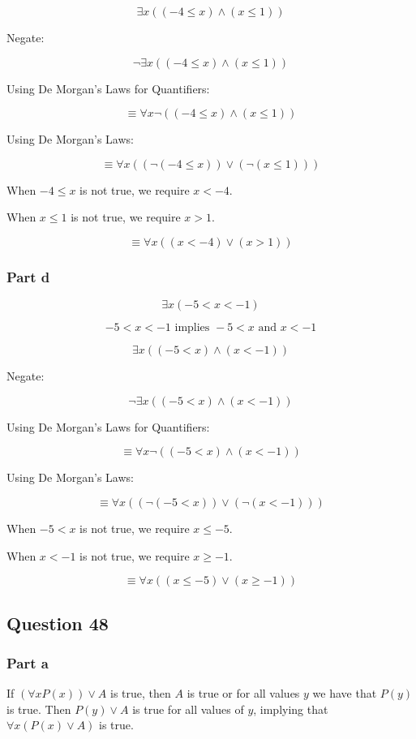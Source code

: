 \documentclass[12pt]{article}
\begin{document}
\[
\exists x ((-4 \leq x) \land (x \leq 1))
\]

Negate:

\[
\neg \exists x ((-4 \leq x) \land (x \leq 1))
\]

Using De Morgan's Laws for Quantifiers:

\[
\equiv \forall x \neg ((-4 \leq x) \land (x \leq 1))
\]

Using De Morgan's Laws:

\[
\equiv \forall x ((\neg (-4 \leq x)) \lor (\neg (x \leq 1)))
\]

When \( -4 \leq x \) is not true, we require \( x < -4 \).

When \( x \leq 1 \) is not true, we require \( x > 1 \).

\[
\equiv \forall x ((x < -4) \lor (x > 1))
\]

\subsubsection*{Part d}

\[
\exists x (-5 < x < -1)
\]

\[
-5 < x < -1 \text{ implies } -5 < x \text{ and } x < -1
\]

\[
\exists x ((-5 < x) \land (x < -1))
\]

Negate:

\[
\neg \exists x ((-5 < x) \land (x < -1))
\]

Using De Morgan's Laws for Quantifiers:

\[
\equiv \forall x \neg ((-5 < x) \land (x < -1))
\]

Using De Morgan's Laws:

\[
\equiv \forall x ((\neg (-5 < x)) \lor (\neg (x < -1)))
\]

When \( -5 < x \) is not true, we require \( x \leq -5 \).

When \( x < -1 \) is not true, we require \( x \geq -1 \).

\[
\equiv \forall x ((x \leq -5) \lor (x \geq -1))
\]

\subsection*{Question 48}

\subsubsection*{Part a}

If $(\forall x P(x)) \lor A$ is true, then $A$ is true or for all values $y$ 
we have that $P(y)$ is true. Then $P(y) \lor A$ is true for all values of $y$, 
implying that $\forall x (P(x) \lor A)$ is true.
\end{document}
